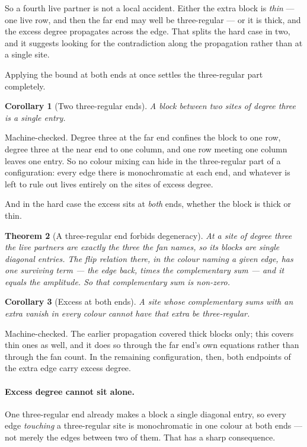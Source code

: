 \documentclass[11pt]{article}
\newtheorem{theorem}{Theorem}[section]
\newtheorem{corollary}[theorem]{Corollary}
\theoremstyle{definition}
\theoremstyle{remark}
\begin{document}
So a fourth live partner is not a local accident. Either the extra block is \emph{thin} ---
one live row, and then the far end may well be three-regular --- or it is thick, and the
excess degree propagates across the edge. That splits the hard case in two, and it suggests
looking for the contradiction along the propagation rather than at a single site.

Applying the bound at both ends at once settles the three-regular part completely.

\begin{corollary}[Two three-regular ends]\label{cor:singleentry}
A block between two sites of degree three is a single entry.
\end{corollary}

Machine-checked. Degree three at the far end confines the block to one row, degree three at
the near end to one column, and one row meeting one column leaves one entry. So no colour
mixing can hide in the three-regular part of a configuration: every edge there is
monochromatic at each end, and whatever is left to rule out lives entirely on the sites of
excess degree.

And in the hard case the excess sits at \emph{both} ends, whether the block is thick or thin.

\begin{theorem}[A three-regular end forbids degeneracy]\label{thm:threeregend}
At a site of degree three the live partners are exactly the three the fan names, so its
blocks are single diagonal entries. The flip relation there, in the colour naming a given
edge, has one surviving term --- the edge back, times the complementary sum --- and it equals
the amplitude. So that complementary sum is non-zero.
\end{theorem}

\begin{corollary}[Excess at both ends]\label{cor:bothexcess}
A site whose complementary sums with an extra vanish in every colour cannot have that extra
be three-regular.
\end{corollary}

Machine-checked. The earlier propagation covered thick blocks only; this covers thin ones as
well, and it does so through the far end's own equations rather than through the fan count.
In the remaining configuration, then, both endpoints of the extra edge carry excess degree.

\paragraph{Excess degree cannot sit alone.} One three-regular end already makes a block a
single diagonal entry, so every edge \emph{touching} a three-regular site is monochromatic in
one colour at both ends --- not merely the edges between two of them. That has a sharp
consequence.
\end{document}
